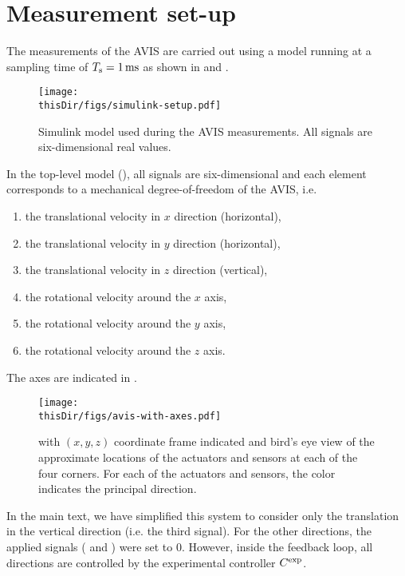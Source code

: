 
\section{ Measurement set-up}
The measurements of the \gls{AVIS} are carried out using a \Simulink model running at a sampling time of $T_{\mathrm{s}} = 1\,\mathrm{ms}$ as shown in  and .

\begin{figure}
\setlength\figurewidth{\columnwidth}
  \texttt{[image: \\thisDir/figs/simulink-setup.pdf]}
  \caption{Simulink model used during the AVIS measurements. All signals are six-dimensional real values.}
  \label{fig:avis:simulink:setup}
\end{figure}

In the top-level model (), all signals are six-dimensional and each element corresponds to a mechanical degree-of-freedom of the \gls{AVIS}, i.e.
\begin{enumerate}
  \item the translational velocity in $x$ direction (horizontal),
  \item the translational velocity in $y$ direction (horizontal),
  \item the translational velocity in $z$ direction (vertical),
  \item the rotational velocity around the $x$ axis,
  \item the rotational velocity around the $y$ axis,
  \item the rotational velocity around the $z$ axis.
\end{enumerate}
The axes are indicated in .

\begin{figure}
  \centering
  \texttt{[image: \\thisDir/figs/avis-with-axes.pdf]}
  \caption{ with $(x,y,z)$ coordinate frame indicated and bird's eye view of the approximate locations of the actuators and sensors at each of the four corners. For each of the actuators and sensors, the color indicates the principal direction.}
  \label{fig:avis:withAxes}
\end{figure}

In the main text, we have simplified this system to consider only the translation in the vertical direction (i.e. the third signal).
For the other directions, the applied signals ( and ) were set to $0$.
However, inside the feedback loop, all directions are controlled by the experimental controller $C^{\mathrm{exp}}$.

